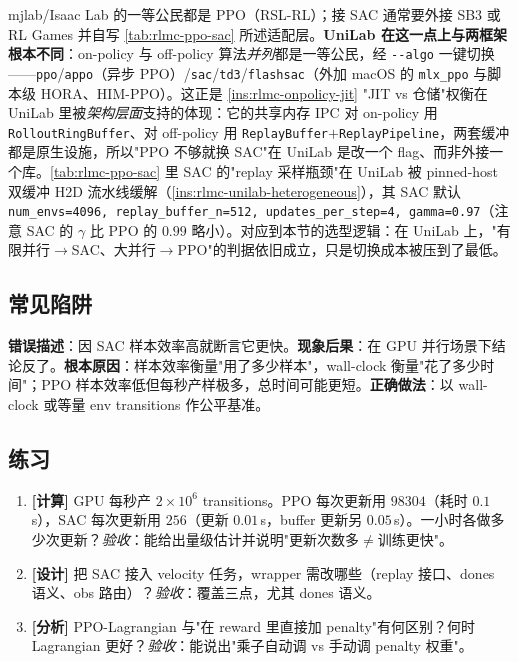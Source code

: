 mjlab/Isaac Lab 的一等公民都是 PPO（RSL-RL）；接 SAC 通常要外接 SB3 或 RL Games 并自写 \cref{tab:rlmc-ppo-sac} 所述适配层。\textbf{UniLab 在这一点上与两框架根本不同}：on-policy 与 off-policy 算法\emph{并列}都是一等公民，经 \verb|--algo| 一键切换——\verb|ppo|/\verb|appo|（异步 PPO）/\verb|sac|/\verb|td3|/\verb|flashsac|（外加 macOS 的 \verb|mlx_ppo| 与脚本级 HORA、HIM-PPO）。这正是 \cref{ins:rlmc-onpolicy-jit} "JIT vs 仓储"权衡在 UniLab 里被\emph{架构层面}支持的体现：它的共享内存 IPC 对 on-policy 用 \verb|RolloutRingBuffer|、对 off-policy 用 \verb|ReplayBuffer|$+$\verb|ReplayPipeline|，两套缓冲都是原生设施，所以"PPO 不够就换 SAC"在 UniLab 是改一个 flag、而非外接一个库。\cref{tab:rlmc-ppo-sac} 里 SAC 的"replay 采样瓶颈"在 UniLab 被 pinned-host 双缓冲 H2D 流水线缓解（\cref{ins:rlmc-unilab-heterogeneous}），其 SAC 默认 \verb|num_envs=4096, replay_buffer_n=512, updates_per_step=4, gamma=0.97|（注意 SAC 的 $\gamma$ 比 PPO 的 $0.99$ 略小）。对应到本节的选型逻辑：在 UniLab 上，"有限并行$\to$SAC、大并行$\to$PPO"的判据依旧成立，只是切换成本被压到了最低。

\subsection{常见陷阱}

\begin{pitfall}
\textbf{错误描述}：因 SAC 样本效率高就断言它更快。\textbf{现象后果}：在 GPU 并行场景下结论反了。\textbf{根本原因}：样本效率衡量"用了多少样本"，wall-clock 衡量"花了多少时间"；PPO 样本效率低但每秒产样极多，总时间可能更短。\textbf{正确做法}：以 wall-clock 或等量 env transitions 作公平基准。
\end{pitfall}

\subsection{练习}

\begin{practice}[选型分析]
\begin{enumerate}
  \item \textbf{[计算]} GPU 每秒产 $2\times10^6$ transitions。PPO 每次更新用 $98304$（耗时 $0.1\,$s），SAC 每次更新用 $256$（更新 $0.01\,$s，buffer 更新另 $0.05\,$s）。一小时各做多少次更新？\emph{验收}：能给出量级估计并说明"更新次数多$\ne$训练更快"。
  \item \textbf{[设计]} 把 SAC 接入 velocity 任务，wrapper 需改哪些（replay 接口、dones 语义、obs 路由）？\emph{验收}：覆盖三点，尤其 dones 语义。
  \item \textbf{[分析]} PPO-Lagrangian 与"在 reward 里直接加 penalty"有何区别？何时 Lagrangian 更好？\emph{验收}：能说出"乘子自动调 vs 手动调 penalty 权重"。
\end{enumerate}
\end{practice}

